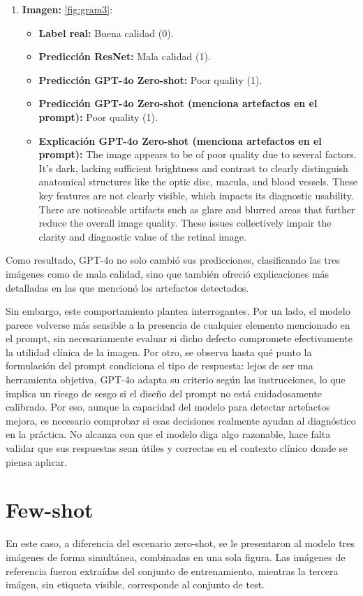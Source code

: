 \begin{enumerate}
\begin{itemize}
	\end{itemize}
	\item \textbf{Imagen:} \ref{fig:gram3}:
	\begin{itemize}
		\item \textbf{Label real:} Buena calidad (0).
		\item \textbf{Predicción ResNet:} Mala calidad (1).
		\item \textbf{Predicción GPT-4o Zero-shot:} Poor quality (1).
		\item \textbf{Predicción GPT-4o Zero-shot (menciona artefactos en el prompt):} Poor quality (1).
		\item \textbf{Explicación GPT-4o Zero-shot (menciona artefactos en el prompt):} The image appears to be of poor quality due to several factors. It's dark, lacking sufficient brightness and contrast to clearly distinguish anatomical structures like the optic disc, macula, and blood vessels. These key features are not clearly visible, which impacts its diagnostic usability. There are noticeable artifacts such as glare and blurred areas that further reduce the overall image quality. These issues collectively impair the clarity and diagnostic value of the retinal image.
	\end{itemize}
\end{enumerate}

Como resultado, GPT-4o no solo cambió sus predicciones, clasificando las tres imágenes como de mala calidad, sino que también ofreció explicaciones más detalladas en las que mencionó los artefactos detectados.

Sin embargo, este comportamiento plantea interrogantes. Por un lado, el modelo parece volverse más sensible a la presencia de cualquier elemento mencionado en el prompt, sin necesariamente evaluar si dicho defecto compromete efectivamente la utilidad clínica de la imagen. Por otro, se observa hasta qué punto la formulación del prompt condiciona el tipo de respuesta: lejos de ser una herramienta objetiva, GPT-4o adapta su criterio según las instrucciones, lo que implica un riesgo de sesgo si el diseño del prompt no está cuidadosamente calibrado. Por eso, aunque la capacidad del modelo para detectar artefactos mejora, es necesario comprobar si esas decisiones realmente ayudan al diagnóstico en la práctica. No alcanza con que el modelo diga algo razonable, hace falta validar que sus respuestas sean útiles y correctas en el contexto clínico donde se piensa aplicar.



\section{Few-shot}
En este caso, a diferencia del escenario zero-shot, se le presentaron al modelo tres imágenes de forma simultánea, combinadas en una sola figura. Las imágenes de referencia fueron extraídas del conjunto de entrenamiento, mientras la tercera imágen, sin etiqueta visible, corresponde al conjunto de test.

